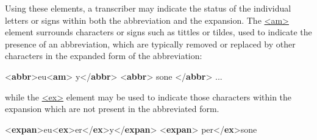  Using these elements, a transcriber may indicate the status of the individual letters or signs within both the abbreviation and the expansion. The \hyperref[TEI.am]{<am>} element surrounds characters or signs such as tittles or tildes, used to indicate the presence of an abbreviation, which are typically removed or replaced by other characters in the expanded form of the abbreviation: \par\bgroup{}\exampleFont \begin{shaded}\noindent\mbox{}{<\textbf{abbr}>}eu{<\textbf{am}>}\mbox{}\newline 
\hspace*{1em}\mbox{}\newline 
{}y{</\textbf{abbr}>}\mbox{}\newline 
{<\textbf{abbr}>}\mbox{}\newline 
{}\mbox{}\newline 
\hspace*{1em}\mbox{}\newline 
{}sone\mbox{}\newline 
{</\textbf{abbr}>} ... \end{shaded}\egroup\par \noindent  while the \hyperref[TEI.ex]{<ex>} element may be used to indicate those characters within the expansion which are not present in the abbreviated form. \par\bgroup{}\exampleFont \begin{shaded}\noindent\mbox{}{<\textbf{expan}>}eu{<\textbf{ex}>}er{</\textbf{ex}>}y{</\textbf{expan}>}\mbox{}\newline 
{<\textbf{expan}>}\mbox{}\newline 
{}per{</\textbf{ex}>}sone\mbox{}\newline 

\end{shaded}
